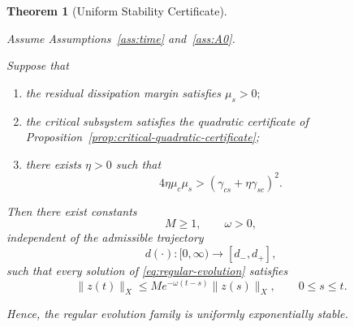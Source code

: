 \documentclass[10pt,a4paper]{amsart}
\newtheorem{theorem}{Theorem}
\begin{document}
\begin{theorem}[Uniform Stability Certificate]
\label{thm:critical-residual-certificate}

Assume Assumptions~\ref{ass:time} and~\ref{ass:A0}.

Suppose that

\begin{enumerate}

\item
the residual dissipation margin satisfies
\(
\mu_s>0;
\)

\item
the critical subsystem satisfies the quadratic certificate of
Proposition~\ref{prop:critical-quadratic-certificate};

\item
there exists
\(
\eta>0
\)
such that
\begin{equation}
4\eta\mu_c\mu_s
>
\left(
\gamma_{cs}
+
\eta\gamma_{sc}
\right)^2.
\label{eq:small-gain-condition}
\end{equation}

\end{enumerate}

Then there exist constants
\[
M\ge1,
\qquad
\omega>0,
\]
independent of the admissible trajectory
\[
d(\cdot):[0,\infty)\rightarrow[d_-,d_+],
\]
such that every solution of
\eqref{eq:regular-evolution}
satisfies
\begin{equation}
\|z(t)\|_X
\le
Me^{-\omega(t-s)}
\|z(s)\|_X,
\qquad
0\le s\le t.
\label{eq:uniform-global-decay}
\end{equation}

Hence, the regular evolution family is uniformly exponentially stable.

\end{theorem}
\end{document}
